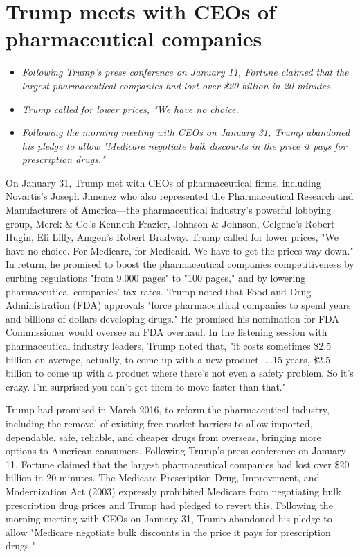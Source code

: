 \section{Trump meets with CEOs of pharmaceutical
companies}\label{trump-meets-with-ceos-of-pharmaceutical-companies}

\begin{itemize}
\item
  \emph{Following Trump's press conference on January 11, Fortune
  claimed that the largest pharmaceutical companies had lost over \$20
  billion in 20 minutes.}
\item
  \emph{Trump called for lower prices, "We have no choice.}
\item
  \emph{Following the morning meeting with CEOs on January 31, Trump
  abandoned his pledge to allow "Medicare negotiate bulk discounts in
  the price it pays for prescription drugs."}
\end{itemize}

On January 31, Trump met with CEOs of pharmaceutical firms, including
Novartis's Joseph Jimenez who also represented the Pharmaceutical
Research and Manufacturers of America---the pharmaceutical industry's
powerful lobbying group, Merck \& Co.'s Kenneth Frazier, Johnson \&
Johnson, Celgene's Robert Hugin, Eli Lilly, Amgen's Robert Bradway.
Trump called for lower prices, "We have no choice. For Medicare, for
Medicaid. We have to get the prices way down." In return, he promised to
boost the pharmaceutical companies competitiveness by curbing
regulations "from 9,000 pages" to "100 pages," and by lowering
pharmaceutical companies' tax rates. Trump noted that Food and Drug
Administration (FDA) approvals "force pharmaceutical companies to spend
years and billions of dollars developing drugs." He promised his
nomination for FDA Commissioner would oversee an FDA overhaul. In the
listening session with pharmaceutical industry leaders, Trump noted
that, "it costs sometimes \$2.5 billion on average, actually, to come up
with a new product. ...15 years, \$2.5 billion to come up with a product
where there's not even a safety problem. So it's crazy. I'm surprised
you can't get them to move faster than that."

Trump had promised in March 2016, to reform the pharmaceutical industry,
including the removal of existing free market barriers to allow
imported, dependable, safe, reliable, and cheaper drugs from overseas,
bringing more options to American consumers. Following Trump's press
conference on January 11, Fortune claimed that the largest
pharmaceutical companies had lost over \$20 billion in 20 minutes. The
Medicare Prescription Drug, Improvement, and Modernization Act (2003)
expressly prohibited Medicare from negotiating bulk prescription drug
prices and Trump had pledged to revert this. Following the morning
meeting with CEOs on January 31, Trump abandoned his pledge to allow
"Medicare negotiate bulk discounts in the price it pays for prescription
drugs."

